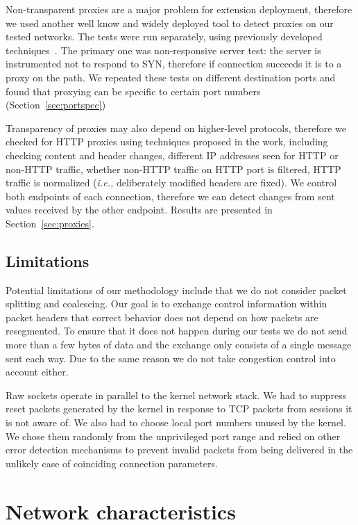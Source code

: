 \documentclass{sig-alternate-10pt}
\providecommand{\ie}{\emph{i.e.,} }
\begin{document}
Non-transparent proxies are a major problem for extension deployment, therefore we used another well know and widely deployed tool to detect proxies on our tested networks. The tests were run separately, using previously developed techniques~\cite{Weaver:RHwbx82O}. The primary one was non-responsive server test: the server is instrumented not to respond to SYN, therefore if connection succeeds it is to a proxy on the path. We repeated these tests on different destination ports and found that proxying can be specific to certain port numbers (Section~\ref{sec:portspec})

Transparency of proxies may also depend on higher-level protocols, therefore we checked for HTTP proxies using techniques proposed in the work, including checking content and header changes, different IP addresses seen for HTTP or non-HTTP traffic, whether non-HTTP traffic on HTTP port is filtered, HTTP traffic is normalized (\ie deliberately modified headers are fixed). We control both endpoints of each connection, therefore we can detect changes from sent values received by the other endpoint. Results are presented in Section~\ref{sec:proxies}.

\subsection{Limitations}

Potential limitations of our methodology include that we do not consider packet splitting and coalescing. Our goal is to exchange control information within packet headers that correct behavior does not depend on how packets are resegmented. To ensure that it does not happen during our tests we do not send more than a few bytes of data and the exchange only consists of a single message sent each way. Due to the same reason we do not take congestion control into account either.

Raw sockets operate in parallel to the kernel network stack. We had to suppress reset packets generated by the kernel in response to TCP packets from sessions it is not aware of. We also had to choose local port numbers unused by the kernel. We chose them randomly from the unprivileged port range and relied on other error detection mechanisms to prevent invalid packets from being delivered in the unlikely case of coinciding connection parameters. 

\section{Network characteristics}
\label{sec:network}
\end{document}

